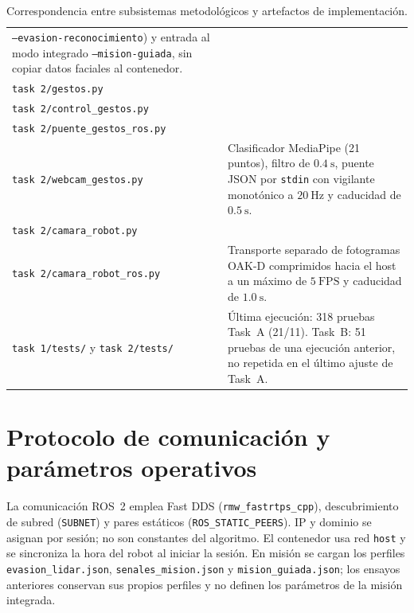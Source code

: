 \documentclass[11pt,a4paper]{article}
\begin{document}
\begin{table}[htbp]
\begin{tabularx}{\textwidth}{@{}P{6.2cm}Y@{}}
    \texttt{--evasion-reconocimiento}) y entrada al modo integrado
    \texttt{--mision-guiada}, sin copiar datos faciales al contenedor.\\
    \texttt{task 2/gestos.py}\\
    \texttt{task 2/control\_\allowbreak gestos.py}\\
    \texttt{task 2/puente\_\allowbreak gestos\_\allowbreak ros.py}\\
    \texttt{task 2/webcam\_\allowbreak gestos.py} &
    Clasificador MediaPipe (21 puntos), filtro de $0.4\ \mathrm{s}$, puente
    JSON por \texttt{stdin} con vigilante monotónico a $20\ \mathrm{Hz}$ y
    caducidad de $0.5\ \mathrm{s}$.\\
    \texttt{task 2/camara\_\allowbreak robot.py}\\
    \texttt{task 2/camara\_\allowbreak robot\_\allowbreak ros.py} &
    Transporte separado de fotogramas OAK-D comprimidos hacia el host a un
    máximo de $5\ \mathrm{FPS}$ y caducidad de $1.0\ \mathrm{s}$.\\
    \texttt{task 1/tests/} y \texttt{task 2/tests/} &
    Última ejecución: 318 pruebas Task~A (21/11). Task~B: 51 pruebas de una
    ejecución anterior, no repetida en el último ajuste de Task~A.\\
    \hline
  \end{tabularx}
  \caption{Correspondencia entre subsistemas metodológicos y artefactos de
  implementación.}
  \label{tab:apendice_archivos}
\end{table}

\section{Protocolo de comunicación y parámetros operativos}

\begingroup\small
La comunicación ROS~2 emplea Fast DDS
(\texttt{rmw\_\allowbreak fastrtps\_\allowbreak cpp}), descubrimiento de subred
(\texttt{SUBNET}) y pares estáticos (\texttt{ROS\_\allowbreak STATIC\_\allowbreak PEERS}).
IP y dominio se asignan por sesión; no son constantes del algoritmo. El contenedor
usa red \texttt{host} y se sincroniza la hora del robot al iniciar la sesión.
En misión se cargan los perfiles \texttt{evasion\_\allowbreak lidar.json},
\texttt{senales\_\allowbreak mision.json} y
\texttt{mision\_\allowbreak guiada.json}; los ensayos anteriores conservan sus
propios perfiles y no definen los parámetros de la misión integrada.
\par\endgroup
\end{document}
